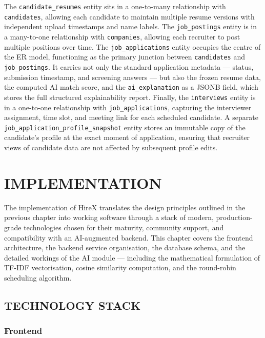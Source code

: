 \documentclass[12pt,a4paper]{report}
\begin{document}
The \texttt{candidate\_resumes} entity sits in a one-to-many relationship with \texttt{candidates}, allowing each candidate to maintain multiple resume versions with independent upload timestamps and name labels. The \texttt{job\_postings} entity is in a many-to-one relationship with \texttt{companies}, allowing each recruiter to post multiple positions over time. The \texttt{job\_applications} entity occupies the centre of the ER model, functioning as the primary junction between \texttt{candidates} and \texttt{job\_postings}. It carries not only the standard application metadata — status, submission timestamp, and screening answers — but also the frozen resume data, the computed AI match score, and the \texttt{ai\_explanation} as a JSONB field, which stores the full structured explainability report. Finally, the \texttt{interviews} entity is in a one-to-one relationship with \texttt{job\_applications}, capturing the interviewer assignment, time slot, and meeting link for each scheduled candidate. A separate \texttt{job\_application\_profile\_snapshot} entity stores an immutable copy of the candidate's profile at the exact moment of application, ensuring that recruiter views of candidate data are not affected by subsequent profile edits.

\chapter{IMPLEMENTATION}

The implementation of HireX translates the design principles outlined in the previous chapter into working software through a stack of modern, production-grade technologies chosen for their maturity, community support, and compatibility with an AI-augmented backend. This chapter covers the frontend architecture, the backend service organisation, the database schema, and the detailed workings of the AI module — including the mathematical formulation of TF-IDF vectorisation, cosine similarity computation, and the round-robin scheduling algorithm.

\section{TECHNOLOGY STACK}

\subsection{Frontend}
\end{document}
